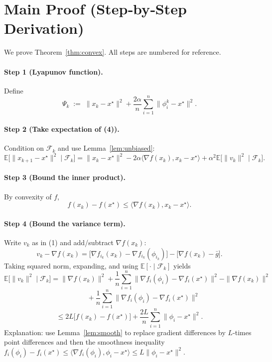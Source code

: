 \documentclass{article}
\newcommand{\E}{\mathbb{E}}
\begin{document}
\section*{Main Proof (Step‑by‑Step Derivation)}
We prove Theorem~\ref{thm:convex}. All steps are numbered for reference.

\paragraph{Step 1 (Lyapunov function).}
Define
\[
\Psi_k\;:=\;\|x_k-x^{\star}\|^{2}
+\frac{2\alpha}{n}\sum_{i=1}^{n}\|\phi_i^{k}-x^{\star}\|^{2}.
\tag{5}
\]

\paragraph{Step 2 (Take expectation of (4)).}
Condition on $\mathcal{F}_k$ and use Lemma~\ref{lem:unbiased}:
\[
\E\!\bigl[\|x_{k+1}-x^{\star}\|^{2}\mid\mathcal{F}_k\bigr]
= \|x_k-x^{\star}\|^{2}
-2\alpha\langle\nabla f(x_k),x_k-x^{\star}\rangle
+\alpha^{2}\E\!\bigl[\|v_k\|^{2}\mid\mathcal{F}_k\bigr].
\tag{6}
\]

\paragraph{Step 3 (Bound the inner product).}
By convexity of $f$,
\[
f(x_k)-f(x^{\star})\le\langle\nabla f(x_k),x_k-x^{\star}\rangle.
\tag{7}
\]

\paragraph{Step 4 (Bound the variance term).}
Write $v_k$ as in (1) and add/subtract $\nabla f(x_k)$:
\[
v_k-\nabla f(x_k)=\bigl[\nabla f_{i_k}(x_k)-\nabla f_{i_k}(\phi_{i_k})\bigr]
-\bigl[\nabla f(x_k)-\bar g\bigr].
\]
Taking squared norm, expanding, and using $\E[\cdot\mid\mathcal{F}_k]$ yields
\[
\E\!\bigl[\|v_k\|^{2}\mid\mathcal{F}_k\bigr]
= \|\nabla f(x_k)\|^{2}
+\frac{1}{n}\sum_{i=1}^{n}\|\nabla f_i(\phi_i)-\nabla f_i(x^{\star})\|^{2}
- \|\nabla f(x_k)\|^{2}
\]
\[
\qquad\qquad
+\frac{1}{n}\sum_{i=1}^{n}\|\nabla f_i(\phi_i)-\nabla f_i(x^{\star})\|^{2}
\]
\[
\le 2L\bigl[f(x_k)-f(x^{\star})\bigr]
+ \frac{2L}{n}\sum_{i=1}^{n}\|\phi_i-x^{\star}\|^{2}.
\tag{8}
\]
Explanation: use Lemma~\ref{lem:smooth} to replace gradient differences by $L$‑times point differences and then the smoothness inequality $f_i(\phi_i)-f_i(x^{\star})\le\langle\nabla f_i(\phi_i),\phi_i-x^{\star}\rangle\le L\|\phi_i-x^{\star}\|^{2}$.
\end{document}

